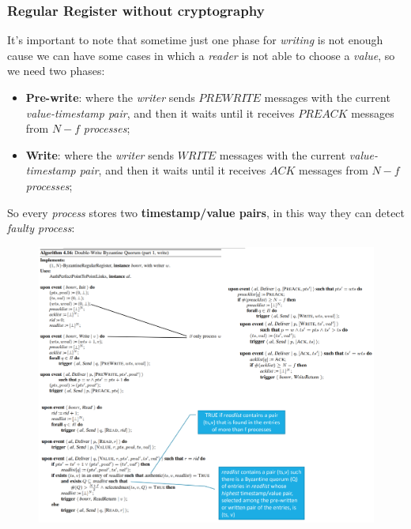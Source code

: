 \documentclass{article}
\begin{document}
\subsubsection{Regular Register without cryptography}
It's important to note that sometime just one phase for \emph{writing} is not enough cause we can have some cases in which a \emph{reader} is not able to choose a \emph{value}, so we need two phases:
\begin{itemize}
\item \textbf{Pre-write}: where the \emph{writer} sends $PREWRITE$ messages with the current \emph{value-timestamp pair}, and then it waits until it receives $PREACK$ messages from $N-f$ \emph{processes};
\item \textbf{Write}: where the \emph{writer} sends $WRITE$ messages with the current \emph{value-timestamp pair}, and then it waits until it receives $ACK$ messages from $N-f$ \emph{processes};
\end{itemize}
So every \emph{process} stores two \textbf{timestamp/value pairs}, in this way they can detect \emph{faulty process}:
\begin{figure}[H]
  \centering
  \includegraphics[scale=0.85,left]{cattura91.png}
\end{figure}
\end{document}
